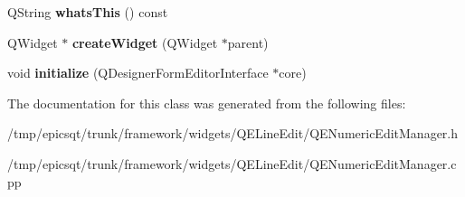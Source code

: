 \begin{DoxyCompactItemize}
\item 
\hypertarget{classQENumericEditManager_afa95236dd231c5ce0bdea0cb89a48c2f}{
QString {\bfseries whatsThis} () const }
\label{classQENumericEditManager_afa95236dd231c5ce0bdea0cb89a48c2f}

\item 
\hypertarget{classQENumericEditManager_a47242b01686cdcfdc78dbd55f65e29df}{
QWidget $\ast$ {\bfseries createWidget} (QWidget $\ast$parent)}
\label{classQENumericEditManager_a47242b01686cdcfdc78dbd55f65e29df}

\item 
\hypertarget{classQENumericEditManager_a596459068458057e899dd5fb139adb5d}{
void {\bfseries initialize} (QDesignerFormEditorInterface $\ast$core)}
\label{classQENumericEditManager_a596459068458057e899dd5fb139adb5d}

\end{DoxyCompactItemize}


The documentation for this class was generated from the following files:\begin{DoxyCompactItemize}
\item 
/tmp/epicsqt/trunk/framework/widgets/QELineEdit/QENumericEditManager.h\item 
/tmp/epicsqt/trunk/framework/widgets/QELineEdit/QENumericEditManager.cpp\end{DoxyCompactItemize}
